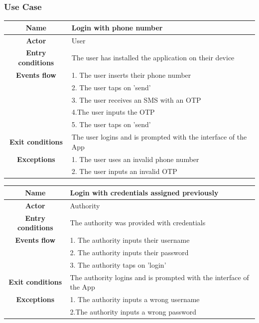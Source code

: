 \subsubsection{Use Case} 
\vspace{1cm}
\begin{flushleft}
\begin{tabular}{|c|l|}
\hline
\textbf{Name} & Login with phone number\\ \hline
\textbf{Actor} & User\\ \hline
\textbf{Entry conditions} & The user has installed the application on their device\\ \hline
\textbf{Events flow} & 1. The user inserts their phone number\\ & 2. The user taps on 'send'\\ & 3. The user receives an SMS with an OTP\\ & 4.The user inputs the OTP\\ & 5. The user taps on 'send'\\ \hline
\textbf{Exit conditions} &  The user logins and is prompted with the interface of the App\\ \hline
\textbf{Exceptions} &  1. The user uses an invalid phone number\\& 2. The user inputs an invalid OTP\\ 
\hline 
\end{tabular}
\end{flushleft} 
\vspace{1.5cm}
\begin{flushleft}
\begin{tabular}{|c|l|}
\hline
\textbf{Name} & Login with credentials assigned previously\\ \hline
\textbf{Actor} & Authority\\ \hline
\textbf{Entry conditions} & The authority was provided with credentials\\ \hline
\textbf{Events flow} & 1. The authority inputs their username\\& 2. The authority inputs their password\\& 3. The authority taps on 'login'\\ \hline
\textbf{Exit conditions} & The authority logins and is prompted with the interface of the App\\ \hline
\textbf{Exceptions} & 1. The authority inputs a wrong username\\& 2.The authority inputs a wrong password\\
\hline 
\end{tabular} 
\end{flushleft}
